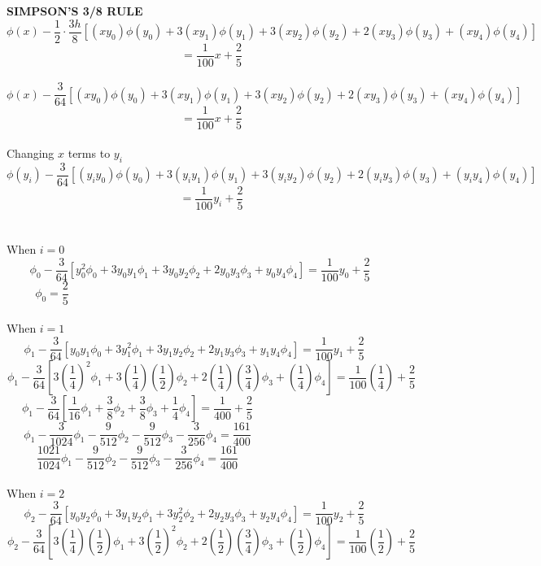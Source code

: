 \documentclass[a4paper,12pt]{report}
\newcommand{\bt}[1]{\textbf{#1}}
\newcommand{\spn}[1]{\\[#1cm]}
\newcommand{\NI}{\noindent}
\begin{document}
	\NI\bt{SIMPSON'S 3/8 RULE}
	$$
		\phi(x) - \frac{1}{2} \cdot \frac{3h}{8} \left[(xy_0)\phi(y_0) + 3(xy_1)\phi(y_1) + 3(xy_2)\phi(y_2) + 2(xy_3)\phi(y_3)+(xy_4)\phi(y_4)\right] 
	$$
	$$
		= \frac{1}{100}x + \frac{2}{5}
	$$\spn{-0.8}
	$$
		\phi(x) -\frac{3}{64} \left[(xy_0)\phi(y_0) + 3(xy_1)\phi(y_1) + 3(xy_2)\phi(y_2) + 2(xy_3)\phi(y_3)+(xy_4)\phi(y_4)\right] 
	$$
	\begin{equation}
		= \frac{1}{100}x + \frac{2}{5} \tag{6} \label{eq:i}
	\end{equation}
	\\Changing $x$ terms to $y_i$
	$$
		\phi(y_i) - \frac{3}{64} \left[(y_iy_0)\phi(y_0) + 3(y_iy_1)\phi(y_1) + 3(y_iy_2)\phi(y_2) + 2(y_iy_3)\phi(y_3)+(y_iy_4)\phi(y_4)\right] 
	$$
	$$
		= \frac{1}{100}y_i + \frac{2}{5}
	$$\spn{-0.8}
	\\When $i=0$
	$$
		\phi_0 - \frac{3}{64} \left[y_0^2\phi_0 + 3y_0y_1\phi_1 + 3y_0y_2\phi_2 + 2y_0y_3\phi_3+y_0y_4\phi_4\right] = \frac{1}{100}y_0 + \frac{2}{5}\qquad
	$$
	\begin{equation}
		\phi_0 = \frac{2}{5}\qquad\qquad\qquad\qquad\qquad\qquad\qquad\qquad\qquad\qquad\qquad\qquad\qquad\qquad \tag{i}
	\end{equation}
	\\When $i=1$
	$$
		\phi_1 - \frac{3}{64} \left[y_0y_1\phi_0 + 3y_1^2\phi_1 + 3y_1y_2\phi_2 + 2y_1y_3\phi_3+y_1y_4\phi_4\right] = \frac{1}{100}y_1 + \frac{2}{5}\qquad\quad
	$$
	$$
		\phi_1 - \frac{3}{64} \left[3\left(\frac{1}{4}\right)^2\phi_1 + 3\left(\frac{1}{4}\right)\left(\frac{1}{2}\right)\phi_2 + 2\left(\frac{1}{4}\right)\left(\frac{3}{4}\right)\phi_3 + \left(\frac{1}{4}\right)\phi_4\right] = \frac{1}{100}\left(\frac{1}{4}\right) + \frac{2}{5}
	$$
	$$
		\phi_1 - \frac{3}{64} \left[\frac{1}{16}\phi_1 + \frac{3}{8}\phi_2 + \frac{3}{8}\phi_3 + \frac{1}{4}\phi_4\right] = \frac{1}{400} + \frac{2}{5}\qquad\qquad\qquad\qquad\qquad\qquad\quad
	$$
	$$
		\phi_1 - \frac{3}{1024}\phi_1 - \frac{9}{512}\phi_2 - \frac{9}{512}\phi_3 - \frac{3}{256}\phi_4 = \frac{161}{400}\qquad\qquad\qquad\qquad\qquad\qquad\quad
	$$
	\begin{equation}
		\frac{1021}{1024}\phi_1 - \frac{9}{512}\phi_2 - \frac{9}{512}\phi_3 - \frac{3}{256}\phi_4 = \frac{161}{400}\qquad\qquad\qquad\qquad\qquad\qquad\quad \tag{ii}
	\end{equation}
	\\When $i=2$
	$$
		\phi_2 - \frac{3}{64} \left[y_0y_2\phi_0 + 3y_1y_2\phi_1 + 3y_2^2\phi_2 + 2y_2y_3\phi_3+y_2y_4\phi_4\right] = \frac{1}{100}y_2 + \frac{2}{5}\qquad\quad
	$$
	$$
		\phi_2 - \frac{3}{64} \left[3\left(\frac{1}{4}\right)\left(\frac{1}{2}\right)\phi_1 + 3\left(\frac{1}{2}\right)^2\phi_2 + 2\left(\frac{1}{2}\right)\left(\frac{3}{4}\right)\phi_3 + \left(\frac{1}{2}\right)\phi_4\right] = \frac{1}{100}\left(\frac{1}{2}\right) + \frac{2}{5}
	$$
\end{document}
